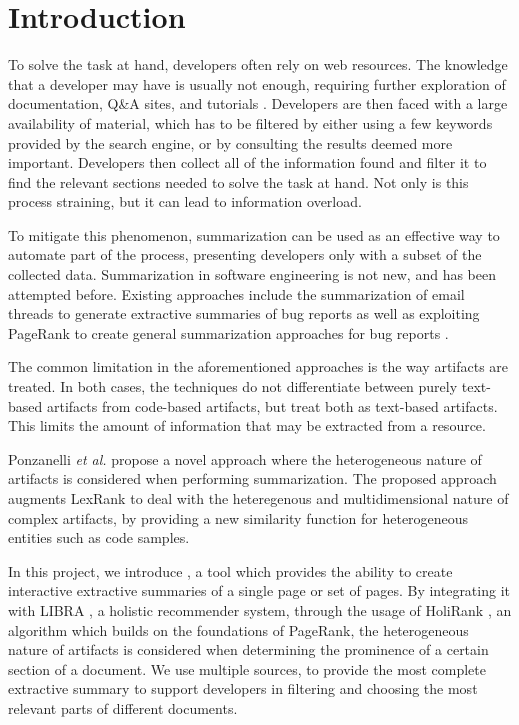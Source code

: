 \section{Introduction}\label{sec:introduction}
To solve the task at hand, developers often rely on web resources. The knowledge that a developer may have is usually not enough, requiring further exploration of documentation, Q\&A sites, and tutorials \cite{A1}. Developers are then faced with a large availability of material, which has to be filtered by either using a few keywords provided by the search engine, or by consulting the results deemed more important. Developers then collect all of the information found and filter it to find the relevant sections needed to solve the task at hand. Not only is this process straining, but it can lead to information overload.

To mitigate this phenomenon, summarization can be used as an effective way to automate part of the process, presenting developers only with a subset of the collected data. Summarization in software engineering is not new, and has been attempted before. Existing approaches include the summarization of email threads \cite{A4} to generate extractive summaries of bug reports as well as exploiting PageRank \cite{ilprints422} to create general summarization approaches for bug reports \cite{A5}. 

The common limitation in the aforementioned approaches is the way artifacts are treated. In both cases, the techniques do not differentiate between purely text-based artifacts from code-based artifacts, but treat both as text-based artifacts. This limits the amount of information that may be extracted from a resource. 

Ponzanelli \textit{et al.} \cite{Ponz2015b} propose a novel approach where the heterogeneous nature of artifacts is considered when performing summarization. The proposed approach augments LexRank \cite{Erkan:2004:LGL:1622487.1622501} to deal with the heteregenous and multidimensional nature of complex artifacts, by providing a new similarity function for heterogeneous entities such as code samples. 

 In this project, we introduce \projectName, a tool which provides the ability to create interactive extractive summaries of a single page or set of pages. By integrating it with LIBRA \cite{Ponz2017a}, a holistic recommender system,  through the usage of HoliRank \cite{Ponz2017a}, an algorithm which builds on the foundations of PageRank\cite{ilprints422}, the heterogeneous nature of artifacts is considered when determining the prominence of a certain section of a document. We use multiple sources, to provide the most complete extractive summary to support developers in filtering and choosing the most relevant parts of different documents.


